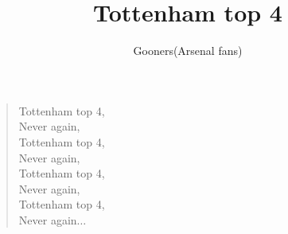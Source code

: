 \documentclass[a4paper,12pt]{article}
\title{Tottenham top 4}
\author{Gooners(Arsenal fans)}
\date{}
\begin{document}
	
	\maketitle
	
	\begin{verse}
		
		Tottenham top 4, \\
		Never again, \\
		Tottenham top 4, \\
		Never again, \\
		Tottenham top 4, \\
		Never again, \\
		Tottenham top 4, \\
		Never again$\ldots$
		
	\end{verse}
	
\end{document}
